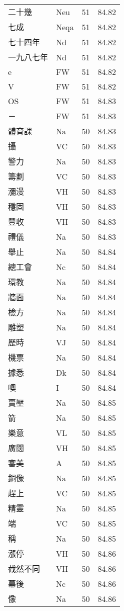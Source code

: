 \documentclass[twocolumn]{book}
\begin{document}
\begin{supertabular}{llrr}
二十幾 & Neu & 51 &  84.82\\
七成 & Neqa & 51 &  84.82\\
七十四年 & Nd & 51 &  84.82\\
一九八七年 & Nd & 51 &  84.82\\
e & FW & 51 &  84.82\\
V & FW & 51 &  84.82\\
OS & FW & 51 &  84.83\\
－ & FW & 51 &  84.83\\
體育課 & Na & 50 &  84.83\\
攝 & VC & 50 &  84.83\\
警力 & Na & 50 &  84.83\\
籌劃 & VC & 50 &  84.83\\
瀰漫 & VH & 50 &  84.83\\
穩固 & VH & 50 &  84.83\\
豐收 & VH & 50 &  84.83\\
禮儀 & Na & 50 &  84.83\\
舉止 & Na & 50 &  84.84\\
總工會 & Nc & 50 &  84.84\\
環教 & Na & 50 &  84.84\\
牆面 & Na & 50 &  84.84\\
檢方 & Na & 50 &  84.84\\
雕塑 & Na & 50 &  84.84\\
歷時 & VJ & 50 &  84.84\\
機票 & Na & 50 &  84.84\\
據悉 & Dk & 50 &  84.84\\
噢 & I & 50 &  84.84\\
賣壓 & Na & 50 &  84.85\\
箭 & Na & 50 &  84.85\\
樂意 & VL & 50 &  84.85\\
廣闊 & VH & 50 &  84.85\\
審美 & A & 50 &  84.85\\
銅像 & Na & 50 &  84.85\\
趕上 & VC & 50 &  84.85\\
精靈 & Na & 50 &  84.85\\
端 & VC & 50 &  84.85\\
稱 & Na & 50 &  84.85\\
漲停 & VH & 50 &  84.86\\
截然不同 & VH & 50 &  84.86\\
幕後 & Nc & 50 &  84.86\\
像 & Na & 50 &  84.86\\

\end{supertabular}
\end{document}

